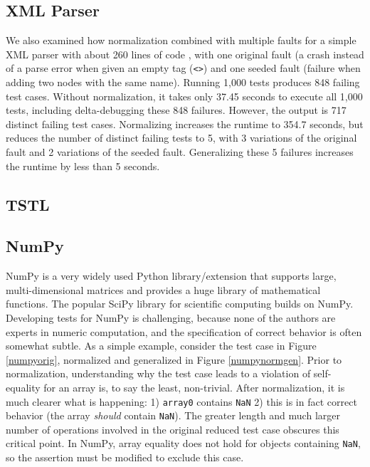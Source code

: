 \subsection{XML Parser}

We also examined how normalization combined with multiple faults for a
simple XML parser with about 260 lines of code \cite{myxml}, with one
original fault (a crash instead of a parse error when given an empty
tag ({\tt <>}) and one seeded fault (failure when adding two nodes
with the same name).  Running 1,000 tests produces 848 failing test
cases.  Without normalization, it takes only 37.45 seconds to execute
all 1,000 tests, including delta-debugging these 848 failures.
However, the output is 717 distinct failing test cases.  Normalizing
increases the runtime to 354.7 seconds, but reduces the number of
distinct failing tests to 5, with 3 variations of the original fault
and 2 variations of the seeded fault.  Generalizing these 5 failures
increases the runtime by less than 5 seconds.

\subsection{TSTL}

\subsection{NumPy}

NumPy \cite{NumPy} is a very widely used Python library/extension that supports
large, multi-dimensional matrices and provides a huge library of
mathematical functions.  The popular SciPy library for scientific
computing builds on NumPy.  Developing tests for NumPy is challenging,
because none of the authors are experts in numeric computation, and
the specification of correct behavior is often somewhat subtle.  As a
simple example, consider the test case in Figure \ref{numpyorig},
normalized and generalized in Figure \ref{numpynormgen}.  Prior to
normalization, understanding why the test case leads to a violation of
self-equality for an array is, to say the least, non-trivial.  After
normalization, it is much clearer what is happening:
1) {\tt array0} contains {\tt NaN} 2) this is in fact correct
behavior (the array \emph{should} contain {\tt NaN}).  The greater
length and much larger number of operations involved in the original
reduced test case obscures this critical point.  In NumPy, array
equality does not hold for objects containing {\tt NaN}, so the
assertion must be modified to exclude this case.

